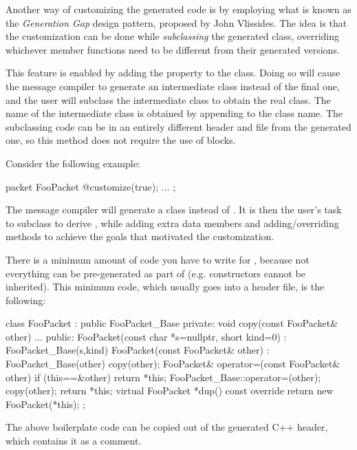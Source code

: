 Another way of customizing the generated code is by employing what is known as
the \textit{Generation Gap} design pattern, proposed by John Vlissides. The idea
is that the customization can be done while \textit{subclassing} the generated
class, overriding whichever member functions need to be different from their
generated versions.

This feature is enabled by adding the  property to the class.
Doing so will cause the message compiler to generate an intermediate class
instead of the final one, and the user will subclass the intermediate class to
obtain the real class. The name of the intermediate class is obtained by
appending  to the class name. The subclassing code can be in an
entirely different header and  file from the generated one, so this
method does not require the use of  blocks.

Consider the following example:

\begin{msg}
packet FooPacket
{
   @customize(true);
   ...
};
\end{msg}

The message compiler will generate a  class instead of
. It is then the user's task to subclass  to
derive , while adding extra data members and adding/overriding
methods to achieve the goals that motivated the customization.

There is a minimum amount of code you have to write for , because
not everything can be pre-generated as part of  (e.g.
constructors cannot be inherited). This minimum code, which usually goes into a
header file, is the following:

\begin{cpp}
class FooPacket : public FooPacket_Base
{
  private:
    void copy(const FooPacket& other) { ... }
  public:
    FooPacket(const char *s=nullptr, short kind=0) : FooPacket_Base(s,kind) {}
    FooPacket(const FooPacket& other) : FooPacket_Base(other) {copy(other);}
    FooPacket& operator=(const FooPacket& other) {if (this==&other) return *this;
        FooPacket_Base::operator=(other); copy(other); return *this;}
    virtual FooPacket *dup() const override {return new FooPacket(*this);}
};
\end{cpp}

\begin{note}
  The above boilerplate code can be copied out of the generated C++ header, which
  contains it as a comment.
\end{note}

